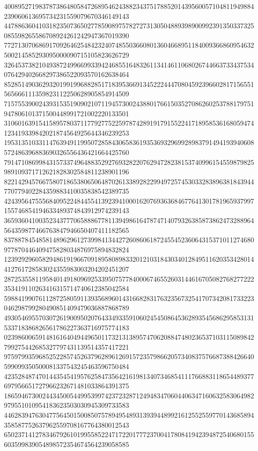 \begin{DoxyCode}
      400895271983787386480584726895462438823437517885201439560057104811949884239060613695734231559079670346149143
      447886360410318235073650277859089757827273130504889398900992391350337325085598265586708924261242947367019390
      772713070686917092646254842324074855036608013604668951184009366860954632500214585293095000090715105823626729
      326453738210493872499669933942468551648326113414611068026744663733437534076429402668297386522093570162638464
      852851490362932019919968828517183953669134522244470804592396602817156551565666111359823112250628905854914509
      715755390024393153519090210711945730024388017661503527086260253788179751947806101371500448991721002220133501
      310601639154158957803711779277522597874289191791552241718958536168059474123419339842021874564925644346239253
      195313510331147639491199507285843065836193536932969928983791494193940608572486396883690326556436421664425760
      791471086998431573374964883529276932822076294728238153740996154559879825989109371712621828302584811238901196
      822142945766758071865380650648702613389282299497257453033283896381843944770779402284359883410035838542389735
      424395647555684095224844554139239410001620769363684677641301781965937997155746854194633489374843912974239143
      365936041003523437770658886778113949861647874714079326385873862473288964564359877466763847946650407411182565
      837887845485814896296127399841344272608606187245545236064315371011274680977870446409475828034876975894832824
      123929296058294861919667091895808983320121031843034012849511620353428014412761728583024355983003204202451207
      287253558119584014918096925339507577840006746552603144616705082768277222353419110263416315714740612385042584
      598841990761128725805911393568960143166828317632356732541707342081733223046298799280490851409479036887868789
      493054695570307261900950207643349335910602454508645362893545686295853131533718386826561786227363716975774183
      023986006591481616404944965011732131389574706208847480236537103115089842799275442685327797431139514357417221
      975979935968525228574526379628961269157235798662057340837576687388426640599099350500081337543245463596750484
      423528487470144354541957625847356421619813407346854111766883118654489377697956651727966232671481033864391375
      186594673002443450054499539974237232871249483470604406347160632583064982979551010954183623503030945309733583
      446283947630477564501500850757894954893139394489921612552559770143685894358587752637962559708167764380012543
      650237141278346792610199558522471722017772370041780841942394872540680155603599839054898572354674564239058585

\end{DoxyCode}
